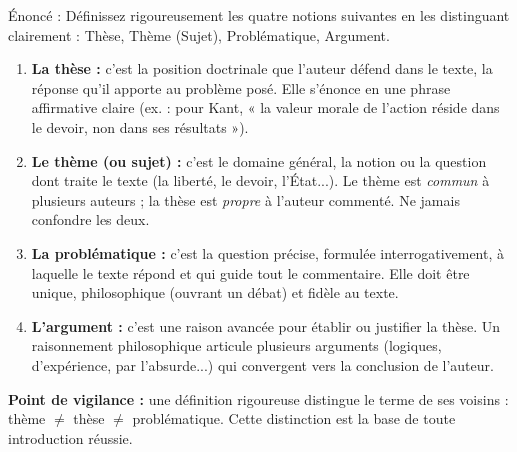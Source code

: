 \documentclass[11pt]{article}
\begin{document}
\begin{exoresolu}
Énoncé : Définissez rigoureusement les quatre notions suivantes en les distinguant clairement : Thèse, Thème (Sujet), Problématique, Argument.
\tcblower
\begin{enumerate}
\item \textbf{La thèse :} c'est la position doctrinale que l'auteur défend dans le texte, la réponse qu'il apporte au problème posé. Elle s'énonce en une phrase affirmative claire (ex. : pour Kant, « la valeur morale de l'action réside dans le devoir, non dans ses résultats »).
\item \textbf{Le thème (ou sujet) :} c'est le domaine général, la notion ou la question dont traite le texte (la liberté, le devoir, l'État...). Le thème est \emph{commun} à plusieurs auteurs ; la thèse est \emph{propre} à l'auteur commenté. Ne jamais confondre les deux.
\item \textbf{La problématique :} c'est la question précise, formulée interrogativement, à laquelle le texte répond et qui guide tout le commentaire. Elle doit être unique, philosophique (ouvrant un débat) et fidèle au texte.
\item \textbf{L'argument :} c'est une raison avancée pour établir ou justifier la thèse. Un raisonnement philosophique articule plusieurs arguments (logiques, d'expérience, par l'absurde...) qui convergent vers la conclusion de l'auteur.
\end{enumerate}

\textbf{Point de vigilance :} une définition rigoureuse distingue le terme de ses voisins : thème $\neq$ thèse $\neq$ problématique. Cette distinction est la base de toute introduction réussie.
\end{exoresolu}
\end{document}
